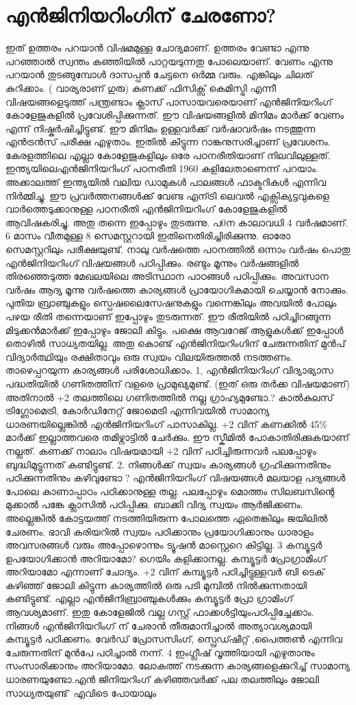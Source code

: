 \documentclass[10pt,a4paper]{report}
\begin{document}
  \section{ എൻജിനിയറിംഗിന് ചേരണോ?}
  ഇത് ഉത്തരം പറയാൻ വിഷമമുള്ള ചോദ്യമാണ്. ഉത്തരം വേണ്ടാ എന്നു പറഞ്ഞാൽ സ്വന്തം കഞ്ഞിയിൽ പാറ്റയടുന്നതു പോലെയാണ്. വേണം എന്നു പറയാൻ തുടങ്ങുമ്പോൾ ദാസപ്പൻ ചേട്ടനെ ഒർമ്മ വരും. എങ്കിലും ചിലത് കുറിക്കാം. ( വാര്യരാണ് ഗുരു) കണക്ക് ഫിസിക്സ് കെമിസ്ട്രി എന്നീ വിഷയങ്ങളെടുത്ത് പന്ത്രണ്ടാം ക്ലാസ് പാസായവരെയാണ് എൻജിനിയറിംഗ് കോളേജുകളിൽ പ്രവേശിപ്പിക്കുന്നത്. ഈ വിഷയങ്ങളിൽ മിനിമം മാർക്ക് വേണം എന്ന് നിഷ്കർഷിച്ചിട്ടുണ്ട്. ഈ മിനിമം ഉള്ളവർക്ക് വർഷാവർഷം നടത്തുന്ന എൻട്രൻസ് പരീക്ഷ എഴുതാം. ഇതിൽ കിട്ടുന്ന റാങ്കനുസരിച്ചാണ് പ്രവേശനം.‌ കേരളത്തിലെ എല്ലാ കോളേജുകളിലും ഒരേ പഠനരീതിയാണ് നിലവിലുള്ളത്. ഇന്ത്യയിലെഎൻജിനിയറിംഗ് പഠനരീതി 1960 കളിലേതാണെന്ന് പറയാം. അക്കാലത്ത് ഇന്ത്യയിൽ വലിയ ഡാമുകൾ പാലങ്ങൾ ഫാക്ടറികൾ എന്നിവ നിർമ്മിച്ചു. ഈ പ്രവർത്തനങ്ങൾക്ക് വേണ്ട എന്ട്രി ലെവൽ എക്സിക്യട്ടവുകളെ വാർത്തെടുക്കാനുള്ള പഠനരീതി എൻജിനിയറിംഗ് കോളേജുകളിൽ ആവിഷകരിച്ചു. അതു തന്നെ ഇപ്പോഴും തുടരുന്നു. പ0ന കാലാവധി 4 വർഷമാണ്. 6 മാസം വീതമുള്ള 8 സെമസ്റ്ററായി ഇതിനെതിരിച്ചിരിക്കുന്നു. ഓരോ സെമസ്റ്ററിലും പരീക്ഷയുണ്ട്. നാലു വർഷത്തെ പഠനത്തിൽ ഒന്നാം വർഷം പൊതു എൻജിനിയറിംഗ് വിഷയങ്ങൾ പഠിപ്പിക്കും. രണ്ടും മൂന്നും വർഷങ്ങളിൽ തിരഞ്ഞെടുത്ത മേഖലയിലെ അടിസ്ഥാന പാഠങ്ങൾ പഠിപ്പിക്കും. അവസാന വർഷം ആദ്യ മൂന്നു വർഷത്തെ കാര്യങ്ങൾ പ്രായോഗികമായി ചെയ്യാൻ നോക്കും. പുതിയ ബ്രാഞ്ചുകളും സ്പെഷലൈസേഷനുകളും വന്നെങ്കിലും അവയിൽ പോലും പഴയ രീതി തന്നെയാണ് ഇപ്പോഴും തുടരുന്നത്. ഈ രീതിയിൽ പഠിച്ചിറങ്ങുന്ന മിടുക്കൻമാർക്ക് ഇപ്പോഴും ജോലി കിട്ടും. പക്ഷെ ആവറേജ് ആളുകൾക്ക് ഇപ്പോൾ തൊഴിൽ സാധ്യതയില്ല. അതു കൊണ്ട് എൻജിനിയറിംഗിന് ചേരുന്നതിന് മുൻപ് വിദ്യാർത്ഥിയും രക്ഷിതാവും ഒരു സ്വയം വിലയിരുത്തൽ നടത്തണം. താഴെപ്പറയുന്ന കാര്യങ്ങൾ പരിശോധിക്കാം. 1, എൻജിനിയറിംഗ് വിദ്യാഭ്യാസ പദ്ധതിയിൽ ഗണിതത്തിന് വളരെ പ്രാമുഖ്യമുണ്ട്. (ഇത് ഒരു തർക്ക വിഷയമാണ്) അതിനാൽ +2 തലത്തിലെ ഗണിതത്തിൽ നല്ല ഗ്രാഹ്യമുണ്ടോ.? കാൽകുലസ് ട്രിഗ്ണോമെട്രി, കോർഡിനേറ്റ് ജോമെട്രി എന്നിവയിൽ സാമാന്യ ധാരണയില്ലെങ്കിൽ എൻജിനിയറിംഗ് പാസാകില്ല. +2 വിന് കണക്കിൽ 45\% മാർക്ക് ഇല്ലാത്തവരെ തമിഴ്നാട്ടിൽ ചേർക്കും. ഈ സ്കീമിൽ പോകാതിരിക്കുകയാണ് നല്ലത്. കണക്ക് നാലാം വിഷയമായി +2 വിന് പഠിച്ചിരുന്നവർ പലപ്പോഴും ബുദ്ധിമുട്ടുന്നത് കണ്ടിട്ടുണ്ട്. 2. നിങ്ങൾക്ക് സ്വയം കാര്യങ്ങൾ ഗ്രഹിക്കുന്നതിനും പഠിക്കുന്നതിനും കഴിവുണ്ടോ ? എൻജിനിയറിംഗ് വിഷയങ്ങൾ മലയാള പദ്യങ്ങൾ പോലെ കാണാപ്പാഠം പഠിക്കാനുള്ള തല്ല. പലപ്പോഴും മൊത്തം സിലബസിന്റെ മുക്കാൽ പങ്കേ ക്ലാസിൽ പഠിപ്പിക്കു. ബാക്കി വിദ്യ സ്വയം ആർജിക്കണം. അല്ലെങ്കിൽ കോട്ടയത്ത് നടത്തിയിരുന്ന പോലത്തെ ഏതെങ്കിലും ജയിലിൽ ചേരണം. ഭാവി കരിയറിൽ സ്വയം പഠിക്കാനും പ്രയോഗിക്കാനും ധാരാളം അവസരങ്ങൾ വരും അപ്പോഴൊന്നും ട്യൂഷൻ മാസ്റ്റെറെ കിട്ടില്ല. 3 കമ്പ്യൂട്ടർ ഉപയോഗിക്കാൻ അറിയാമോ? ഗെയിം കളിക്കാനല്ല. കമ്പ്യൂട്ടർ പ്രോഗ്രാമിംഗ് അറിയാമോ എന്നാണ് ചോദ്യം. +2 വിന് കമ്പ്യൂട്ടർ പഠിച്ചിട്ടുള്ളവർ ബി ടെക് കഴിഞ്ഞ് ജോലി കിട്ടുന്ന കാര്യത്തിൽ ഒരു പടി മുമ്പിൽ നിൽക്കുന്നതായി കണ്ടിട്ടുണ്ട്. എല്ലാ എൻജിനിബ്രാഞ്ചുകൾക്കും കമ്പ്യൂട്ടർ പ്രോ ഗ്രാമിംഗ് ആവശ്യമാണ്. ഇതു കോളേജിൽ വല്ല ഗസ്റ്റ് ഫാക്കൾട്ടിയുംപഠിപ്പിച്ചേക്കാം. നിങ്ങൾ എൻജിനിയറിംഗ് ന് ചേരാൻ തീരുമാനിച്ചാൽ അത്യാവശ്യമായി കമ്പ്യൂട്ടർ പഠിക്കണം. വേർഡ് പ്രോസസിംഗ്, സ്പ്രെഡ്ഷീറ്റ് ,പൈത്തൺ എന്നിവ ചേരുന്നതിന് മുൻപേ പഠിച്ചാൽ നന്ന്. 4 ഇംഗ്ലീഷ് വൃത്തിയായി എഴുതാനും സംസാരിക്കാനും അറിയാമോ. ലോകത്ത് നടക്കുന്ന കാര്യങ്ങളെക്കുറിച്ച് സാമാന്യ ധാരണയുണ്ടോ.എൻ ജിനിയറിംഗ് കഴിഞ്ഞവർക്ക് പല തലത്തിലും ജോലി സാധ്യതയുണ്ട്' എവിടെ പോയാലും 
\end{document}
